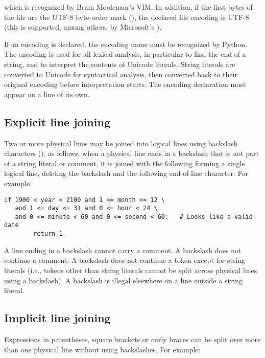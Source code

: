 which is recognized by Bram Moolenaar's VIM. In addition, if the first
bytes of the file are the UTF-8 byte-order mark
(), the declared file encoding is UTF-8
(this is supported, among others, by Microsoft's ).

If an encoding is declared, the encoding name must be recognized by
Python. %
The encoding is used for all lexical analysis, in particular to find
the end of a string, and to interpret the contents of Unicode literals.
String literals are converted to Unicode for syntactical analysis,
then converted back to their original encoding before interpretation
starts. The encoding declaration must appear on a line of its own.

\subsection{Explicit line joining\label{explicit-joining}}

Two or more physical lines may be joined into logical lines using
backslash characters (\code{\e}), as follows: when a physical line ends
in a backslash that is not part of a string literal or comment, it is
joined with the following forming a single logical line, deleting the
backslash and the following end-of-line character.  For example:
%
\begin{verbatim}
if 1900 < year < 2100 and 1 <= month <= 12 \
   and 1 <= day <= 31 and 0 <= hour < 24 \
   and 0 <= minute < 60 and 0 <= second < 60:   # Looks like a valid date
        return 1
\end{verbatim}

A line ending in a backslash cannot carry a comment.  A backslash does
not continue a comment.  A backslash does not continue a token except
for string literals (i.e., tokens other than string literals cannot be
split across physical lines using a backslash).  A backslash is
illegal elsewhere on a line outside a string literal.


\subsection{Implicit line joining\label{implicit-joining}}

Expressions in parentheses, square brackets or curly braces can be
split over more than one physical line without using backslashes.
For example:

